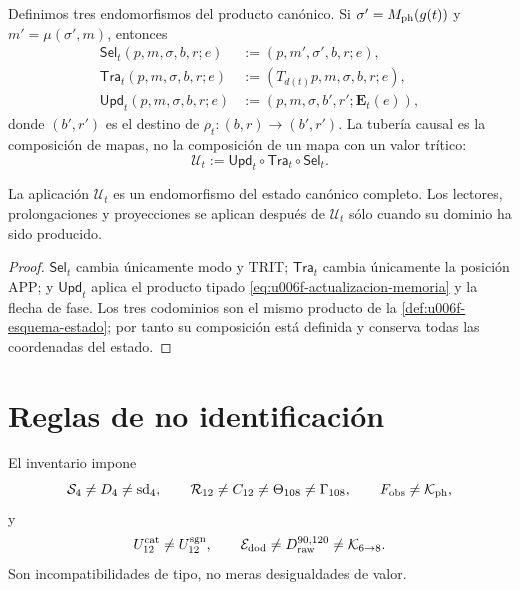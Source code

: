 Definimos tres endomorfismos del producto canónico. Si
\(\sigma'=M_{\rm ph}(g(t))\) y \(m'=\mu(\sigma',m)\), entonces
\begin{align}
 \mathsf{Sel}_t(p,m,\sigma,b,r;e)
  &:=(p,m',\sigma',b,r;e),\label{eq:u006f-selector-tipado}\\
 \mathsf{Tra}_t(p,m,\sigma,b,r;e)
  &:=(T_{d(t)}p,m,\sigma,b,r;e),\label{eq:u006f-transporte-tipado}\\
 \mathsf{Upd}_t(p,m,\sigma,b,r;e)
  &:=(p,m,\sigma,b',r';\mathbf E_t(e)),
 \label{eq:u006f-memoria-tipada}
\end{align}
donde \((b',r')\) es el destino de \(\rho_t:(b,r)\to(b',r')\). La tubería
causal es la composición de mapas, no la composición de un mapa con un valor
trítico:
\begin{equation}
 \boxed{\mathcal U_t:=
 \mathsf{Upd}_t\circ\mathsf{Tra}_t\circ\mathsf{Sel}_t.}
 \label{eq:u006f-tuberia}
\end{equation}

\begin{theorem}
\label{thm:u006f-cierre-tuberia}
La aplicación \(\mathcal U_t\) es un endomorfismo del estado canónico
completo. Los lectores, prolongaciones y proyecciones se aplican después de
\(\mathcal U_t\) sólo cuando su dominio ha sido producido.
\end{theorem}

\begin{proof}
\(\mathsf{Sel}_t\) cambia únicamente modo y TRIT;
\(\mathsf{Tra}_t\) cambia únicamente la posición APP; y
\(\mathsf{Upd}_t\) aplica el producto tipado
\eqref{eq:u006f-actualizacion-memoria} y la flecha de fase. Los tres
codominios son el mismo producto de la
\cref{def:u006f-esquema-estado}; por tanto su composición está definida y
conserva todas las coordenadas del estado.
\end{proof}

\section{Reglas de no identificación}

El inventario impone
\begin{equation}
 \mathcal S_4\neq D_4\neq\operatorname{sd}_4,
 \qquad
 \mathcal R_{12}\neq C_{12}\neq\Theta_{108}\neq\Gamma_{108},
 \qquad
 F_{\rm obs}\neq\mathcal K_{\rm ph},
 \label{eq:u006f-no-identificacion-uno}
\end{equation}
y
\begin{equation}
 U_{12}^{\rm cat}\neq U_{12}^{\rm sgn},
 \qquad
 \mathcal E_{\rm dod}\neq D_{\rm raw}^{90,120}
 \neq\mathcal K_{6\to8}.
 \label{eq:u006f-no-identificacion-dos}
\end{equation}
Son incompatibilidades de tipo, no meras desigualdades de valor.


